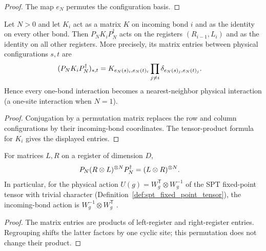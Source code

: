 \begin{proof}\leanok
    The map $e_N$ permutes the configuration basis.
\end{proof}

\begin{lemma}
    \label{thm:spt_incoming_bond_locality}
    \leanok
    Let $N>0$ and let $K_i$ act as a matrix $K$ on incoming bond $i$
    and as the identity on every other bond.  Then
    $P_NK_iP_N^\dagger$ acts on the registers $(R_{i-1},L_i)$ and as
    the identity on all other registers.  More precisely, its matrix
    entries between physical configurations $s,t$ are
    \begin{align}
        (P_NK_iP_N^\dagger)_{s,t}
         & =K_{e_N(s)_i,e_N(t)_i}
        \prod_{j\ne i}\delta_{e_N(s)_j,e_N(t)_j}.
        \notag
    \end{align}
    Hence every one-bond interaction becomes a nearest-neighbor physical
    interaction (a one-site interaction when $N=1$).
\end{lemma}

\begin{proof}\leanok
    Conjugation by a permutation matrix replaces the row and column
    configurations by their incoming-bond coordinates.  The tensor-product
    formula for $K_i$ gives the displayed entries.
\end{proof}

\begin{lemma}
    \label{thm:spt_bond_regrouping_symmetry}
    \leanok
    For matrices $L,R$ on a register of dimension $D$,
    \begin{align}
        P_N(R\otimes L)^{\otimes N}P_N^\dagger
         & =(L\otimes R)^{\otimes N}.
        \notag
    \end{align}
    In particular, for the physical action
    $U(g)=W_g^{\mathsf T}\otimes W_g^{-1}$ of the SPT fixed-point tensor with
    trivial character (Definition~\ref{def:spt_fixed_point_tensor}), the
    incoming-bond action is $W_g^{-1}\otimes W_g^{\mathsf T}$
    \cite[Section~II.F.2]{Schuch2011Phases}.
\end{lemma}

\begin{proof}\leanok
    The matrix entries are products of left-register and right-register
    entries.  Regrouping shifts the latter factors by one cyclic site;
    this permutation does not change their product.
\end{proof}


